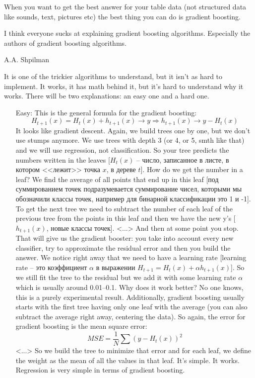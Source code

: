 When you want to get the best answer for your table data (not structured data like sounds, text, pictures etc) the best thing you can do is gradient boosting.
\begin{displayquote}
  {\sf \glqq I think everyone sucks at explaining gradient boosting algorithms. Especially the authors of gradient boosting algorithms.\grqq
  \begin{flushright}
    A.A. Shpilman
  \end{flushright}}
\end{displayquote}
It is one of the trickier algorithms to understand, but it isn't as hard to implement. It works, it has math behind it, but it's hard to understand why it works. There will be two explanations: an easy one and a hard one.
\begin{enumerate}
  \item[Easy:] This is the general formula for the gradient boosting:
  $$H_{t+1}(x)=H_t(x)+h_{t+1}(x)\to y \Rightarrow h_{t+1}(x)\to y - H_t(x)$$
  It looks like gradient descent. {\it <A little meeting with the gradient descent>} Again, we build trees one by one, but we don't use stumps anymore. We use trees with depth 3 (or 4, or 5, smth like that) and we will use regression, not classification. So your tree predicts the numbers written in the leaves [$H_t(x)$ -- число, записанное в листе, в котором <<лежит>> точка $x$, в дереве $t$]. How do we get the number in a leaf? We find the average of all points that end up in this leaf [под суммированием точек подразумевается суммирование чисел, которыми мы обозначили классы точек, например для бинарной классификации это 1 и -1]. {\it <A slide with an example>} To get the next tree we need to subtract the number of each leaf of the previous tree from the points in this leaf and then we have the new y's [$h_{t+1}(x)$, новые классы точек]. <...> And then at some point you stop. That will give us the gradient booster: you take into account every new classifier, try to approximate the residual error and then you build the answer. We notice right away that we need to have a learning rate [learning rate -- это коэффициент $\alpha$ в выражении $H_{t+1}=H_t(x)+\alpha h_{t+1}(x)$]. So we still fit the tree to the residual but we add it with some learning rate $\alpha$ which is usually around 0.01--0.1. Why does it work better? No one knows, this is a purely experimental result. {\it <Some intuition about this experimental result>} Additionally, gradient boosting usually starts with the first tree having only one leaf with the average (you can also subtract the average right away, centering the data). So again, the error for gradient boosting is the mean square error: $$MSE = \frac{1}{N}\sum(y-H_t(x))^2$$ <...> So we build the tree to minimize that error and for each leaf, we define the weight as the mean of all the values in that leaf. It's simple. It works. Regression is very simple in terms of gradient boosting.\\

\end{enumerate}
